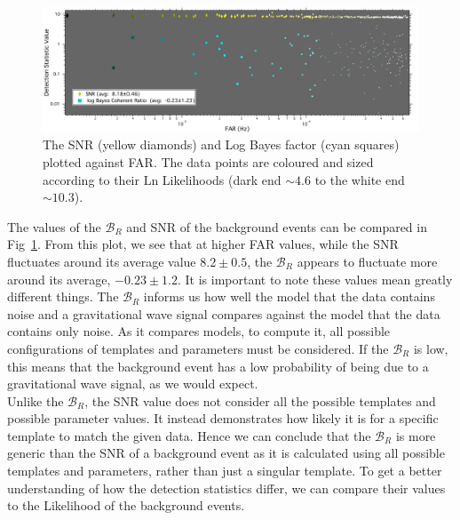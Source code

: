 \documentclass{article}
\begin{document}
  

          
          
                   \begin{figure}[h]
                   	\centering
                   	\includegraphics[width=1\textwidth]{Figures/detectionStatVSfar8s.pdf} 
                   	\caption{The SNR (yellow diamonds) and Log Bayes factor (cyan squares) plotted against FAR. The data points are coloured and sized according to their Ln Likelihoods (dark end $\sim4.6$ to the white end $\sim10.3$). }
                   	\label{Fig:BcrVSFAR}
                   \end{figure}
                   
 
 The values of the $\mathcal{B}_{R}$ and SNR of the background events can be compared in Fig~\ref{Fig:BcrVSFAR}. From this plot, we see that at higher FAR values, while the SNR fluctuates around its average value $8.2\pm0.5$, the $\mathcal{B}_{R}$ appears to fluctuate more around its average, $-0.23\pm1.2$. It is important to note these values mean greatly different things. The $\mathcal{B}_{R}$ informs us how well the model that the data contains noise and a gravitational wave signal compares against the model that the data contains only noise. As it compares models, to compute it, all possible configurations of templates and parameters must be considered. If the $\mathcal{B}_{R}$ is low, this means that the background event has a low probability of being due to a gravitational wave signal, as we would expect.\\
 
 
 Unlike the $\mathcal{B}_{R}$, the SNR value does not consider all the possible templates and possible parameter values. It instead demonstrates how likely it is for a specific template to match the given data. Hence we can conclude that the $\mathcal{B}_{R}$ is more generic than the SNR of a background event as it is calculated using all possible templates and parameters, rather than just a singular template. To get a better understanding of how the detection statistics differ, we can compare their values to the Likelihood of the background events.\\
       
\end{document}

